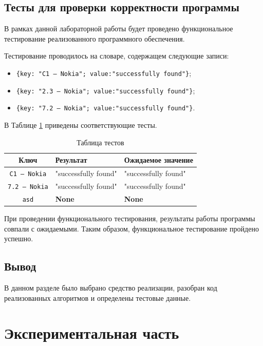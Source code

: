 \documentclass[12pt]{report}
\begin{document}
	
	\section{Тесты для проверки корректности программы}
	В рамках данной лабораторной работы будет проведено функциональное тестирование реализованного программного обеспечения.

	Тестирование проводилось на словаре, содержащем следующие записи:
	\begin{itemize}
		\item \texttt{\{key: "C1 --- Nokia"; value:"successfully found"\}};
		\item \texttt{\{key: "2.3 --- Nokia"; value:"successfully found"\}};
		\item \texttt{\{key: "7.2 --- Nokia"; value:"successfully found"\}}.
	\end{itemize}
	
	В Таблице \ref{tbl:tests} приведены соответствующие тесты.
	
	\begin{table}[H]
		\small
		\begin{center}
			\captionsetup{justification=raggedright, singlelinecheck=false}
			\caption{Таблица тестов}
			\label{tbl:tests}
			\begin{tabular}{|c|l|l|}
				\hline
				\bfseries Ключ & \bfseries Результат & \bfseries Ожидаемое значение \\ \hline
				\texttt{C1 --- Nokia} & "successfully found" & "successfully found" \\\hline
				\texttt{7.2 --- Nokia} & "successfully found" & "successfully found" \\\hline
				\texttt{asd} & \bfseries None & \bfseries None \\\hline
			\end{tabular}
		\end{center}
	\end{table}
	
	При проведении функционального тестирования, результаты работы программы совпали с ожидаемыми. Таким образом, функциональное тестирование пройдено успешно.
	
	\section{Вывод}
	В данном разделе было выбрано средство реализации, разобран код реализованных алгоритмов и определены тестовые данные.
	\newpage
	
	\chapter{Экспериментальная часть}
	
\end{document}
